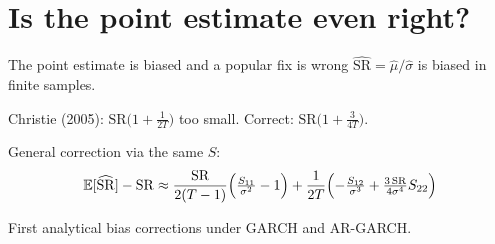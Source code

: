 \documentclass[aspectratio=169,10pt]{beamer}
\begin{document}
\section{Is the point estimate even right?}

\begin{frame}{The point estimate is biased and a popular fix is wrong}
  \setlength{\abovedisplayskip}{3pt}\setlength{\belowdisplayskip}{3pt}%
  \setlength{\abovedisplayshortskip}{1pt}\setlength{\belowdisplayshortskip}{1pt}%
  $\widehat{\mathrm{SR}}=\hat\mu/\hat\sigma$ is biased in finite samples.

  Christie (2005): $\mathrm{SR}\bigl(1+\tfrac{1}{2T}\bigr)$ \alert{too small}.
  Correct: $\mathrm{SR}\bigl(1+\tfrac{3}{4T}\bigr)$. 
  
  General correction via the same $S$:
  \[ \mathbb{E}[\widehat{\mathrm{SR}}]-\mathrm{SR}
     \approx \frac{\mathrm{SR}}{2(T-1)}\Bigl(\tfrac{S_{11}}{\sigma^2}-1\Bigr)
     + \frac{1}{2T}\Bigl(-\tfrac{S_{12}}{\sigma^3} + \tfrac{3\,\mathrm{SR}}{4\sigma^4}S_{22}\Bigr) \]

  \vspace{-0.3em}
  \begin{center}\scriptsize
  \end{center}

  \vspace{-0.2em}
  \begin{center}\small\alert{First analytical bias corrections under GARCH and AR-GARCH.}\end{center}
\end{frame}
\end{document}
